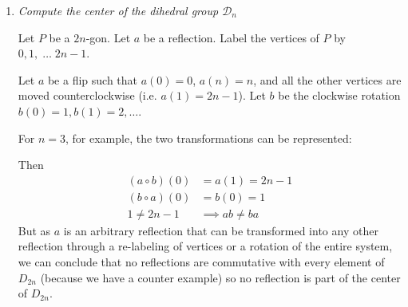\documentclass[12pt]{article}
\newcommand{\R}{\mathbb{R}}
\begin{document}
\begin{enumerate}[label=(\alph*)]
    \item \emph{Compute the center of the dihedral group $\mathcal{D}_n$}
    
    \color{blue}
        Let $P$ be a $2n$-gon. Let $a$ be a reflection. Label the vertices of $P$ by ${0, 1, \; \dots \; 2n - 1}$. 
        
        Let $a$ be a flip such that $a(0) = 0$, $a(n) = n$, and all the other vertices are moved counterclockwise (i.e. $a(1) = 2n -1$). Let $b$ be the clockwise rotation $b(0) = 1, b(1) = 2, \dots$.

        For $n=3$, for example, the two transformations can be represented:
        \begin{center}
        \end{center}
        
        Then 
        \begin{align*}
            (a \circ b)(0) &= a(1) = 2n-1\\
            (b \circ a)(0) &= b(0) = 1\\
            1 \neq 2n - 1 &\implies ab \neq ba
        \end{align*}
        But as $a$ is an arbitrary reflection that can be transformed into any other reflection through a re-labeling of vertices or a rotation of the entire system, we can conclude that no reflections are commutative with every element of $D_{2n}$ (because we have a counter example) so no reflection is part of the center of $D_{2n}$. 
        

\end{enumerate}
\end{document}
